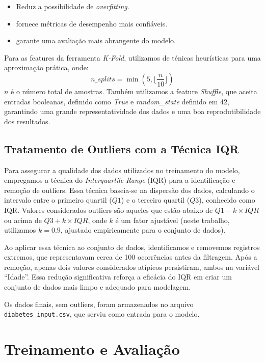 \documentclass[a4paper,12pt]{article}
\begin{document}
\begin{itemize}
    \item Reduz a possibilidade de \textit{overfitting}.
    \item fornece métricas de desempenho mais confiáveis.
    \item garante uma avaliação mais abrangente do modelo.
\end{itemize}
Para as features da ferramenta \textit{K-Fold}, utilizamos de ténicas heurísticas para uma aproximação prática, onde:
\begin{equation}
    n\_splits = \min(5, \lfloor \frac{n}{10} \rfloor)
    \end{equation}
\( n \) é o número total de amostras.
\newline
\newline Também utilizamos a feature \textit{Shuffle}, que aceita entradas booleanas, definido como \textit{True} e \textit{random\_state} definido em 42, garantindo uma grande representatividade dos dados e uma boa reprodutibilidade dos resultados.

\subsection{Tratamento de Outliers com a Técnica IQR}

Para assegurar a qualidade dos dados utilizados no treinamento do modelo, empregamos a técnica do \textit{Interquartile Range} (IQR) para a identificação e remoção de outliers. Essa técnica baseia-se na dispersão dos dados, calculando o intervalo entre o primeiro quartil (\( Q1 \)) e o terceiro quartil (\( Q3 \)), conhecido como IQR. Valores considerados outliers são aqueles que estão abaixo de \( Q1 - k \times IQR \) ou acima de \( Q3 + k \times IQR \), onde \( k \) é um fator ajustável (neste trabalho, utilizamos \( k = 0.9 \), ajustado empiricamente para o conjunto de dados).

Ao aplicar essa técnica ao conjunto de dados, identificamos e removemos registros extremos, que representavam cerca de 100 ocorrências antes da filtragem. Após a remoção, apenas dois valores considerados atípicos persistiram, ambos na variável ``Idade''. Essa redução significativa reforça a eficácia do IQR em criar um conjunto de dados mais limpo e adequado para modelagem.

Os dados finais, sem outliers, foram armazenados no arquivo \texttt{diabetes\_input.csv}, que serviu como entrada para o modelo.

\section{Treinamento e Avaliação}
\end{document}
